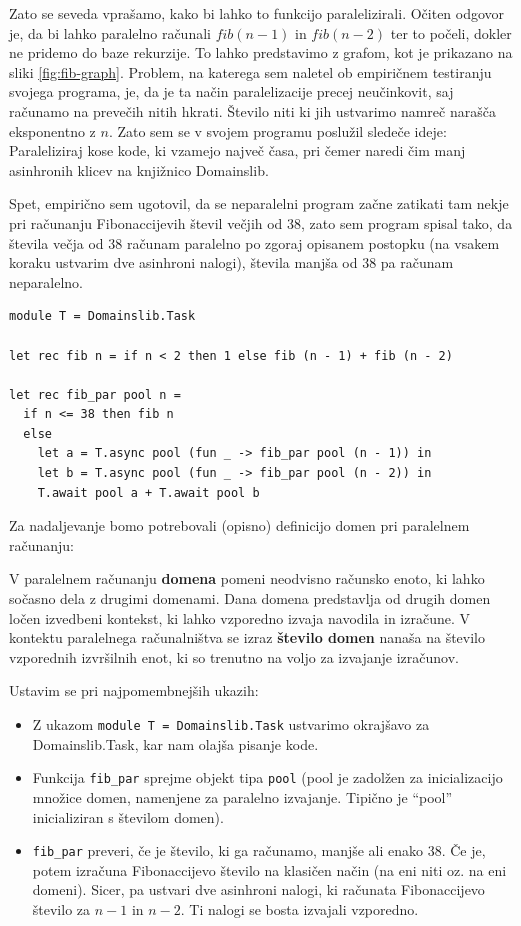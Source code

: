 \documentclass[mat1, tisk]{fmfdelo}
\begin{document}
Zato se seveda vprašamo, kako bi lahko to funkcijo paralelizirali. Očiten odgovor je, da bi lahko paralelno računali $fib(n-1)$ in $fib(n-2)$ ter to počeli,
dokler ne pridemo do baze rekurzije. To lahko predstavimo z grafom, kot je prikazano na sliki \ref{fig:fib-graph}.
Problem, na katerega sem naletel ob empiričnem testiranju svojega programa, je, da je ta način paralelizacije precej neučinkovit, 
saj računamo na prevečih nitih hkrati. Število niti ki jih ustvarimo namreč narašča eksponentno z $n$.
Zato sem se v svojem programu poslužil sledeče ideje: Paraleliziraj kose kode, ki vzamejo največ časa, 
pri čemer naredi čim manj asinhronih klicev na knjižnico Domainslib.

Spet, empirično sem ugotovil, da se neparalelni program začne zatikati tam nekje pri računanju Fibonaccijevih števil večjih od 38, zato sem program spisal tako,
da števila večja od 38 računam paralelno po zgoraj opisanem postopku (na vsakem koraku ustvarim dve asinhroni nalogi), števila manjša od 38 pa računam neparalelno.

\begin{lstlisting}
module T = Domainslib.Task

let rec fib n = if n < 2 then 1 else fib (n - 1) + fib (n - 2)

let rec fib_par pool n =
  if n <= 38 then fib n
  else
    let a = T.async pool (fun _ -> fib_par pool (n - 1)) in
    let b = T.async pool (fun _ -> fib_par pool (n - 2)) in
    T.await pool a + T.await pool b
\end{lstlisting}



Za nadaljevanje bomo potrebovali (opisno) definicijo domen pri paralelnem računanju:
\begin{definicija}
  V paralelnem računanju \textbf{domena} pomeni neodvisno računsko enoto, ki lahko sočasno dela z drugimi domenami.
  Dana domena predstavlja od drugih domen ločen izvedbeni kontekst, ki lahko vzporedno izvaja navodila in izračune.
  V kontektu paralelnega računalništva se izraz \textbf{število domen} nanaša na število vzporednih izvršilnih enot, ki so 
  trenutno na voljo za izvajanje izračunov.
\end{definicija}

Ustavim se pri najpomembnejših ukazih:
\begin{itemize}
  \item Z ukazom \texttt{module T = Domainslib.Task} ustvarimo okrajšavo za Domainslib.Task, kar nam olajša pisanje kode.
  \item Funkcija \texttt{fib\_par} sprejme objekt tipa \texttt{pool} (pool je zadolžen za inicializacijo množice domen, namenjene za 
        paralelno izvajanje. Tipično je ``pool'' inicializiran s številom domen).
  \item \texttt{fib\_par} preveri, če je število, ki ga računamo, manjše ali enako 38. 
        Če je, potem izračuna Fibonaccijevo število na klasičen način (na eni niti oz. na eni domeni).
        Sicer, pa ustvari dve asinhroni nalogi, ki računata Fibonaccijevo število za $n-1$ in $n-2$. Ti nalogi se bosta izvajali vzporedno.
\end{itemize}
\end{document}
